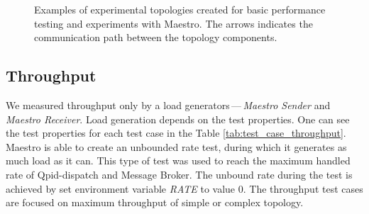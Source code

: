 \begin{figure}[h]
\begin{minipage}{0.45\linewidth}
	\end{minipage}
	\begin{minipage}{0.45\linewidth}
	\end{minipage}
	\caption[Examples of experimental topologies created for basic performance testing and experiments with Maestro.]{Examples of experimental topologies created for basic performance testing and experiments with Maestro. The arrows indicates the communication path between the topology components.}\label{fig:basic_topologies}
\end{figure}

\subsection{Throughput}
\label{Throughput}
We measured throughput only by a load generators\,---\,\emph{Maes\-tro Sender} and \emph{Maestro Receiver}. Load generation depends on the test properties. One can see the test properties for each test case in the Table \ref{tab:test_case_throughput}. Maestro is able to create an unbounded rate test, during which it generates as much load as it can. This type of test was used to reach the maximum handled rate of Qpid-dispatch and Message Broker. The unbound rate during the test is achieved by set environment variable \emph{RATE} to value 0. The throughput test cases are focused on maximum throughput of simple or complex topology.

